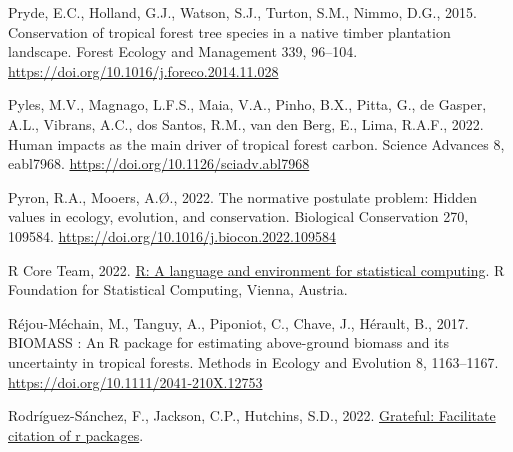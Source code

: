 \documentclass[
  12pt,
]{article}
\newlength{\cslhangindent}
\newlength{\cslentryspacingunit} %
\newenvironment{CSLReferences}[2] %
 {%
  \setlength{\parindent}{0pt}
  \ifodd #1
  \let\oldpar\par
  \def\par{\hangindent=\cslhangindent\oldpar}
  \fi
  \setlength{\parskip}{#2\cslentryspacingunit}
 }%
 {}
\begin{document}
\begin{CSLReferences}{1}{0}
\leavevmode{}%
Pryde, E.C., Holland, G.J., Watson, S.J., Turton, S.M., Nimmo, D.G., 2015. Conservation of tropical forest tree species in a native timber plantation landscape. Forest Ecology and Management 339, 96--104. \url{https://doi.org/10.1016/j.foreco.2014.11.028}

\leavevmode{}%
Pyles, M.V., Magnago, L.F.S., Maia, V.A., Pinho, B.X., Pitta, G., de Gasper, A.L., Vibrans, A.C., dos Santos, R.M., van den Berg, E., Lima, R.A.F., 2022. Human impacts as the main driver of tropical forest carbon. Science Advances 8, eabl7968. \url{https://doi.org/10.1126/sciadv.abl7968}

\leavevmode{}%
Pyron, R.A., Mooers, A.Ø., 2022. The normative postulate problem: {Hidden} values in ecology, evolution, and conservation. Biological Conservation 270, 109584. \url{https://doi.org/10.1016/j.biocon.2022.109584}

\leavevmode{}%
R Core Team, 2022. \href{https://www.R-project.org/}{R: A language and environment for statistical computing}. R Foundation for Statistical Computing, Vienna, Austria.

\leavevmode{}%
Réjou-Méchain, M., Tanguy, A., Piponiot, C., Chave, J., Hérault, B., 2017. {BIOMASS} : An {R} package for estimating above-ground biomass and its uncertainty in tropical forests. Methods in Ecology and Evolution 8, 1163--1167. \url{https://doi.org/10.1111/2041-210X.12753}

\leavevmode{}%
Rodríguez-Sánchez, F., Jackson, C.P., Hutchins, S.D., 2022. \href{https://github.com/Pakillo/grateful}{Grateful: Facilitate citation of r packages}.


\end{CSLReferences}
\end{document}
